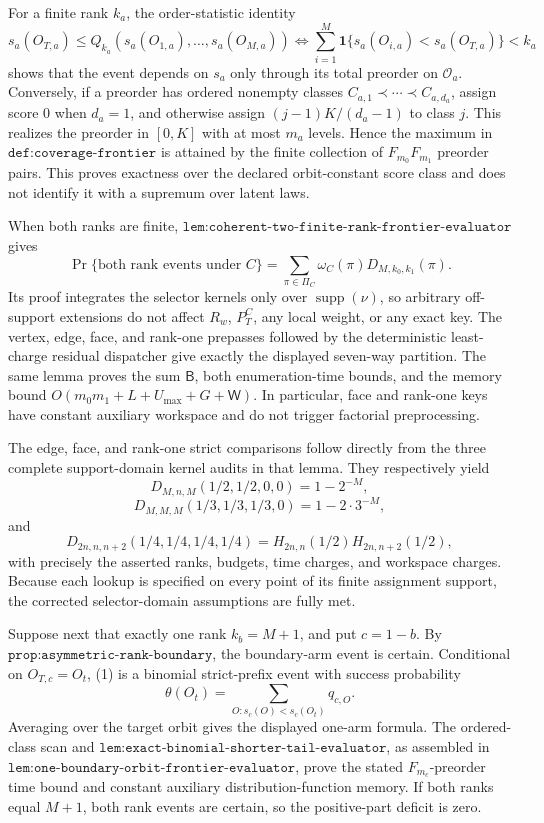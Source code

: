 For a finite rank \(k_a\), the order-statistic identity
\[
s_a(O_{T,a})\le Q_{k_a}(s_a(O_{1,a}),\ldots,s_a(O_{M,a}))
\Longleftrightarrow
\sum_{i=1}^M\mathbf 1\{s_a(O_{i,a})<s_a(O_{T,a})\}<k_a
\tag{1}
\]
shows that the event depends on \(s_a\) only through its total preorder on \(\mathcal O_a\). Conversely, if a preorder has ordered nonempty classes \(C_{a,1}\prec\cdots\prec C_{a,d_a}\), assign score \(0\) when \(d_a=1\), and otherwise assign \((j-1)K/(d_a-1)\) to class \(j\). This realizes the preorder in \([0,K]\) with at most \(m_a\) levels. Hence the maximum in \(\texttt{def:coverage-frontier}\) is attained by the finite collection of \(F_{m_0}F_{m_1}\) preorder pairs. This proves exactness over the declared orbit-constant score class and does not identify it with a supremum over latent laws.

When both ranks are finite, \(\texttt{lem:coherent-two-finite-rank-frontier-evaluator}\) gives
\[
\Pr\{\text{both rank events under }C\}
=\sum_{\pi\in\Pi_C}\omega_C(\pi)D_{M,k_0,k_1}(\pi).
\tag{2}
\]
Its proof integrates the selector kernels only over \(\operatorname{supp}(\nu)\), so arbitrary off-support extensions do not affect \(R_w\), \(P_T^C\), any local weight, or any exact key. The vertex, edge, face, and rank-one prepasses followed by the deterministic least-charge residual dispatcher give exactly the displayed seven-way partition. The same lemma proves the sum \(\mathsf B\), both enumeration-time bounds, and the memory bound \(O(m_0m_1+L+U_{\max}+G+\mathsf W)\). In particular, face and rank-one keys have constant auxiliary workspace and do not trigger factorial preprocessing.

The edge, face, and rank-one strict comparisons follow directly from the three complete support-domain kernel audits in that lemma. They respectively yield
\[
D_{M,n,M}(1/2,1/2,0,0)=1-2^{-M},
\]
\[
D_{M,M,M}(1/3,1/3,1/3,0)=1-2\cdot3^{-M},
\]
and
\[
D_{2n,n,n+2}(1/4,1/4,1/4,1/4)
=H_{2n,n}(1/2)H_{2n,n+2}(1/2),
\]
with precisely the asserted ranks, budgets, time charges, and workspace charges. Because each lookup is specified on every point of its finite assignment support, the corrected selector-domain assumptions are fully met.

Suppose next that exactly one rank \(k_b=M+1\), and put \(c=1-b\). By \(\texttt{prop:asymmetric-rank-boundary}\), the boundary-arm event is certain. Conditional on \(O_{T,c}=O_t\), (1) is a binomial strict-prefix event with success probability
\[
\theta(O_t)=\sum_{O:s_c(O)<s_c(O_t)}q_{c,O}.
\]
Averaging over the target orbit gives the displayed one-arm formula. The ordered-class scan and \(\texttt{lem:exact-binomial-shorter-tail-evaluator}\), as assembled in \(\texttt{lem:one-boundary-orbit-frontier-evaluator}\), prove the stated \(F_{m_c}\)-preorder time bound and constant auxiliary distribution-function memory. If both ranks equal \(M+1\), both rank events are certain, so the positive-part deficit is zero.

